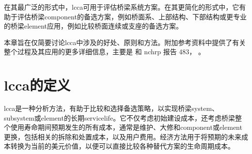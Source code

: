 
在其最广泛的形式中，\acrlong*{lcca}可用于评估桥梁系统方案。在其更简化的形式中，它有助于评估桥梁\gls*{component}的备选方案，例如桥面系、上部结构、下部结构或更专业的桥梁\gls*{element}应用，例如比较桥面连续或支座的备选方案。


本章旨在仅简要讨论\acrlong*{lcca}中涉及的好处、原则和方法。附加参考资料中提供了有关整个过程及其应用的更多详细信息，主要是  \cite{fhwa2002l} 和 \gls{nchrp} 报告 483， \cite{hawk2003b}。

\section[全生命周期成本分析的定义]{\acrlong*{lcca}的定义}
\acrlong*{lcca}是一种分析方法，有助于比较和选择备选策略，以实现桥梁\gls*{system}、\gls*{subsystem}或\gls*{element}的长期\gls*{servicelife}。它不仅考虑初始建设成本，还考虑桥梁整个使用寿命期间预期发生的所有成本，通常是维护、大修和\gls*{component}或\gls*{element}更换，包括相关的拆除和处置成本，以及用户费用。经济方法用于将预期的未来成本转换为当前的美元价值，以便可以直接比较各种替代方案的生命周期成本。

